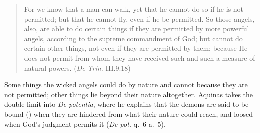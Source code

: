 \begin{quote}
For we know that a man can walk, yet that he cannot do so if he is not
permitted; but that he cannot fly, even if he be permitted. So those
angels, also, are able to do certain things if they are permitted by more
powerful angels, according to the supreme commandment of God; but cannot
do certain other things, not even if they are permitted by them; because
He does not permit from whom they have received such and such a measure of
natural powers. (\emph{De Trin.} III.9.18)
\end{quote}

Some things the wicked angels could do by nature and cannot because they
are not permitted; other things lie beyond their nature altogether. Aquinas
takes the double limit into \emph{De potentia}, where he explains that the
demons are said to be bound () when they are hindered from
what their nature could reach, and loosed when God's judgment permits it
(\emph{De pot.} q.~6 a.~5).

